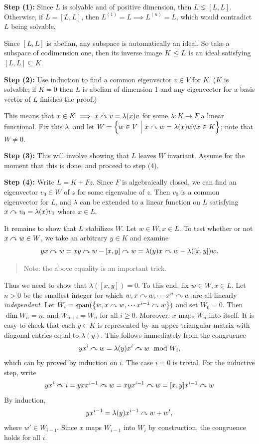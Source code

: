 \textbf{Step (1):} Since \(L\) is solvable and of positive dimension,
then \(L \lneq [L, L]\). Otherwise, if \(L = [L, L]\), then
\(L^{(1)} = L \implies L^{(n)} = L\), which would contradict \(L\) being
solvable.

Since \([L, L]\) is abelian, any subspace is automatically an ideal. So
take a subspace of codimension one, then its inverse image
\(K {~\trianglelefteq~} L\) is an ideal satisfying \([L, L] \subseteq K\).

\textbf{Step (2):} Use induction to find a common eigenvector \(v\in V\)
for \(K\). (\(K\) is solvable; if \(K=0\) then \(L\) is abelian of
dimension 1 and any eigenvector for a basis vector of \(L\) finishes the
proof.)

This means that \(x\in K \implies x\curvearrowright v = \lambda(x) v\) for some
\(\lambda: K \to F\) a linear functional. Fix this \(\lambda\), and let
\(W = \left\{{w\in V {~\mathrel{\Big|}~} x\curvearrowright w = \lambda(x) w \forall x\in K}\right\}\);
note that \(W \neq 0\).

\textbf{Step (3):} This will involve showing that \(L\) leaves \(W\)
invariant. Assume for the moment that this is done, and proceed to step
(4).

\textbf{Step (4):} Write \(L = K + Fz\). Since \(F\) is algebraically
closed, we can find an eigenvector \(v_0 \in W\) of \(z\) for some
eigenvalue of \(z\). Then \(v_0\) is a common eigenvector for \(L\), and
\(\lambda\) can be extended to a linear function on \(L\) satisfying
\(x\curvearrowright v_0 = \lambda(x) v_0\) where \(x\in L\).

It remains to show that \(L\) stabilizes \(W\). Let \(w\in W, x\in L\).
To test whether or not \(x\curvearrowright w \in W\), we take an arbitrary
\(y\in K\) and examine \[
yx \curvearrowright w = xy \curvearrowright w - [x, y]\curvearrowright w = \lambda(y)x\curvearrowright w - \lambda([x, y]) w.
\]

\begin{quote}
Note: the above equality is an important trick.
\end{quote}

Thus we need to show that \(\lambda([x, y]) = 0\). To this end, fix
\(w\in W, x\in L\). Let \(n > 0\) be the smallest integer for which
\(w, x\curvearrowright w, \cdots x^n \curvearrowright w\) are all linearly
\emph{independent}. Let
\(W_i = \mathrm{span}(\left\{{w, x\curvearrowright w, \cdots x^{i-1} \curvearrowright w}\right\})\)
and set \(W_0 = 0\). Then \(\dim W_n = n\), and \(W_{n+i} = W_n\) for
all \(i\geq 0\). Moreover, \(x\) maps \(W_n\) into itself. It is easy to
check that each \(y\in K\) is represented by an upper-triangular matrix
with diagonal entries equal to \(\lambda(y)\). This follows immediately
from the congruence \[
yx^i \curvearrowright w = \lambda(y) x^i \curvearrowright w \mod W_i,
\] which can by proved by induction on \(i\). The case \(i=0\) is
trivial. For the inductive step, write \[
yx^i \curvearrowright i = yxx^{i-1}\curvearrowright w = xyx^{i-1}\curvearrowright w = [x, y]x^{i-1} \curvearrowright w
\] By induction, \[
yx^{i-1} = \lambda(y) x^{i-1}\curvearrowright w + w',
\] where \(w' \in W_{i-1}\). Since \(x\) maps \(W_{i-1}\) into \(W_i\)
by construction, the congruence holds for all \(i\).

